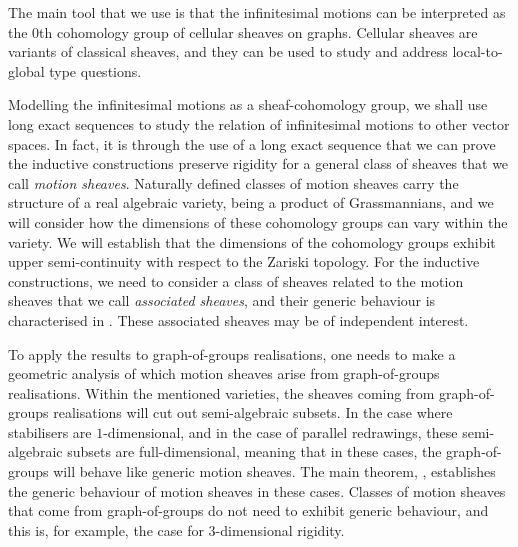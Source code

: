 \documentclass{article}
\theoremstyle{definition}
\theoremstyle{remark}
\begin{document}
The main tool that we use is that the infinitesimal motions can be interpreted as the $0$th cohomology group of cellular sheaves on graphs. Cellular sheaves \cite{currysheaves, Hansen2019} are variants of classical sheaves, and they can be used to study and address local-to-global type questions. 

Modelling the infinitesimal motions as a sheaf-cohomology group, we shall use long exact sequences to study the relation of infinitesimal motions to other vector spaces. In fact, it is through the use of a long exact sequence that we can prove the inductive constructions preserve rigidity for a general class of sheaves that we call \textit{motion sheaves}. Naturally defined classes of motion sheaves carry the structure of a real algebraic variety, being a product of Grassmannians, and we will consider how the dimensions of these cohomology groups can vary within the variety. We will establish that the dimensions of the cohomology groups exhibit upper semi-continuity with respect to the Zariski topology. For the inductive constructions, we need to consider a class of sheaves related to the motion sheaves that we call \textit{associated sheaves}, and their generic behaviour is characterised in . These associated sheaves may be of independent interest.

To apply the results to graph-of-groups realisations, one needs to make a geometric analysis of which motion sheaves arise from graph-of-groups realisations. Within the mentioned varieties, the sheaves coming from graph-of-groups realisations will cut out semi-algebraic subsets. In the case where stabilisers are $1$-dimensional, and in the case of parallel redrawings, these semi-algebraic subsets are full-dimensional, meaning that in these cases, the graph-of-groups will behave like generic motion sheaves. The main theorem, , establishes the generic behaviour of motion sheaves in these cases. Classes of motion sheaves that come from graph-of-groups do not need to exhibit generic behaviour, and this is, for example, the case for $3$-dimensional rigidity. 
 
\end{document}

